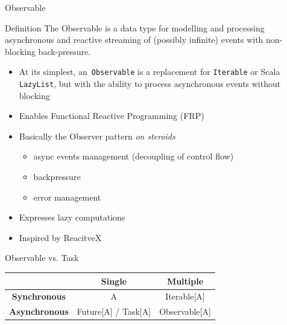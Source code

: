 \documentclass[presentation, 9pt]{beamer}\mode<presentation>{\usetheme{AMSBolognaFC}}
\begin{document}
\begin{frame}{Observable \href{https://monix.io/docs/current/reactive/observable.html}{\faLink}}
	\begin{alertblock}{Definition}
		The Observable is a data type for modelling and processing asynchronous and reactive streaming of (possibly infinite) events with non-blocking back-pressure.
	\end{alertblock}
	\begin{itemize}
		\item At its simplest, an\ \texttt{Observable} is a replacement for \texttt{Iterable} or Scala \texttt{LazyList}, but with the ability to process asynchronous events without blocking
  	\item Enables Functional Reactive Programming (FRP) 
   \item Basically the Observer pattern \emph{on steroids}
   \begin{itemize}
			\item async events management (decoupling of control flow)
   		\item backpressure 
     	\item error management
	 \end{itemize}
   \item Expresses lazy computations
   \item Inspired by ReacitveX \href{https://reactivex.io/intro.html}{\faLink}
	\end{itemize}
	\begin{alertblock}{Observable vs. Task}
		\begin{table}[]
			\centering
			\begin{tabular}{|c|c|c|}
			\hline
									 & \textbf{Single}                      & \textbf{Multiple}          \\ \hline
			\textbf{Synchronous}  & A                           & Iterable{[}A{]}   \\ \hline
			\textbf{Asynchronous} & Future{[}A{]} / Task{[}A{]} & Observable{[}A{]} \\ \hline
			\end{tabular}
			\end{table}
	\end{alertblock}
\end{frame}
\end{document}
